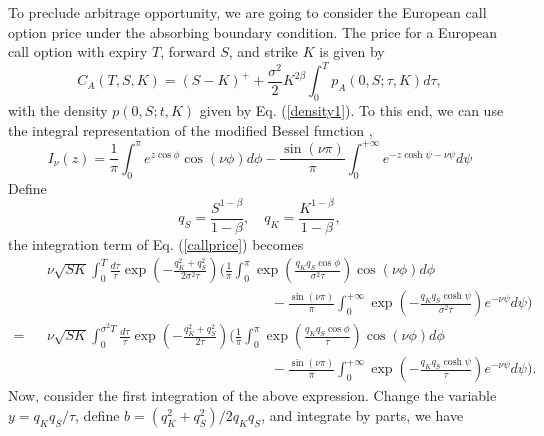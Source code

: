 \documentclass[12pt]{article}
\begin{document}
  To preclude arbitrage opportunity, we are going to consider the European call option price under the absorbing boundary condition.
  The price for a European call option with expiry $T$, forward $S$, and strike $K$ is given by
  \begin{equation}
    C_A(T,S,K) = (S-K)^+ + \frac{\sigma^2}{2}K^{2\beta}\int_0^Tp_A(0,S;\tau,K)d\tau,
    \label{callprice}
  \end{equation}
  with the density $p(0,S;t,K)$ given by Eq. (\ref{density1}). To this end, we can use the integral representation of the modified
  Bessel function \cite{DLMF2},
  \begin{equation}
    I_{\nu}(z) = \frac{1}{\pi}\int_0^{\pi}e^{z\cos\phi}\cos(\nu\phi)d\phi
                - \frac{\sin(\nu\pi)}{\pi}\int_0^{+\infty}e^{-z\cosh \psi - \nu \psi}d\psi
  \end{equation}
  Define
  \begin{equation}
    q_S=\frac{S^{1-\beta}}{1-\beta}, \quad q_K=\frac{K^{1-\beta}}{1-\beta},
  \end{equation}
  the integration term of Eq. (\ref{callprice}) becomes
  \begin{eqnarray}
    && \nu\sqrt{SK}\int_0^T\frac{d\tau}{\tau}\exp\left(-\frac{q_K^2+q_S^2}{2\sigma^2\tau}\right)
    \Bigg(\frac{1}{\pi}\int_0^{\pi}\exp\left(\frac{q_Kq_S\cos\phi}{\sigma^2\tau}\right)\cos(\nu\phi)d\phi\nonumber\\
    && \quad\quad\quad\quad\quad\quad\quad\quad\quad\quad\quad\quad\quad\quad\quad\quad
            - \frac{\sin(\nu\pi)}{\pi}\int_0^{+\infty}\exp\left(-\frac{q_Kq_S\cosh \psi}{\sigma^2\tau}\right)e^{-\nu \psi}d\psi\Bigg)\nonumber\\
    = && \nu\sqrt{SK}\int_0^{\sigma^2 T}\frac{d\tau}{\tau}\exp\left(-\frac{q_K^2+q_S^2}{2\tau}\right)
    \Bigg(\frac{1}{\pi}\int_0^{\pi}\exp\left(\frac{q_Kq_S\cos\phi}{\tau}\right)\cos(\nu\phi)d\phi\nonumber\\
    && \quad\quad\quad\quad\quad\quad\quad\quad\quad\quad\quad\quad\quad\quad\quad\quad
            - \frac{\sin(\nu\pi)}{\pi}\int_0^{+\infty}\exp\left(-\frac{q_Kq_S\cosh \psi}{\tau}\right)e^{-\nu \psi}d\psi\Bigg).
  \end{eqnarray}
  Now, consider the first integration of the above expression. Change the variable $y=q_Kq_S/\tau$, define
  $b=(q_K^2+q_S^2)/2q_Kq_S$, and integrate by parts, we have
\end{document}
